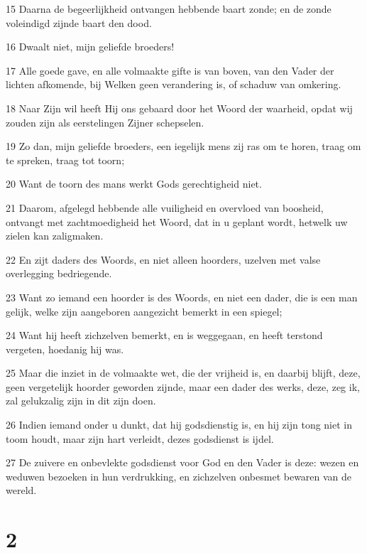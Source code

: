 \par 15 Daarna de begeerlijkheid ontvangen hebbende baart zonde; en de zonde voleindigd zijnde baart den dood.
\par 16 Dwaalt niet, mijn geliefde broeders!
\par 17 Alle goede gave, en alle volmaakte gifte is van boven, van den Vader der lichten afkomende, bij Welken geen verandering is, of schaduw van omkering.
\par 18 Naar Zijn wil heeft Hij ons gebaard door het Woord der waarheid, opdat wij zouden zijn als eerstelingen Zijner schepselen.
\par 19 Zo dan, mijn geliefde broeders, een iegelijk mens zij ras om te horen, traag om te spreken, traag tot toorn;
\par 20 Want de toorn des mans werkt Gods gerechtigheid niet.
\par 21 Daarom, afgelegd hebbende alle vuiligheid en overvloed van boosheid, ontvangt met zachtmoedigheid het Woord, dat in u geplant wordt, hetwelk uw zielen kan zaligmaken.
\par 22 En zijt daders des Woords, en niet alleen hoorders, uzelven met valse overlegging bedriegende.
\par 23 Want zo iemand een hoorder is des Woords, en niet een dader, die is een man gelijk, welke zijn aangeboren aangezicht bemerkt in een spiegel;
\par 24 Want hij heeft zichzelven bemerkt, en is weggegaan, en heeft terstond vergeten, hoedanig hij was.
\par 25 Maar die inziet in de volmaakte wet, die der vrijheid is, en daarbij blijft, deze, geen vergetelijk hoorder geworden zijnde, maar een dader des werks, deze, zeg ik, zal gelukzalig zijn in dit zijn doen.
\par 26 Indien iemand onder u dunkt, dat hij godsdienstig is, en hij zijn tong niet in toom houdt, maar zijn hart verleidt, dezes godsdienst is ijdel.
\par 27 De zuivere en onbevlekte godsdienst voor God en den Vader is deze: wezen en weduwen bezoeken in hun verdrukking, en zichzelven onbesmet bewaren van de wereld.

\chapter{2}

